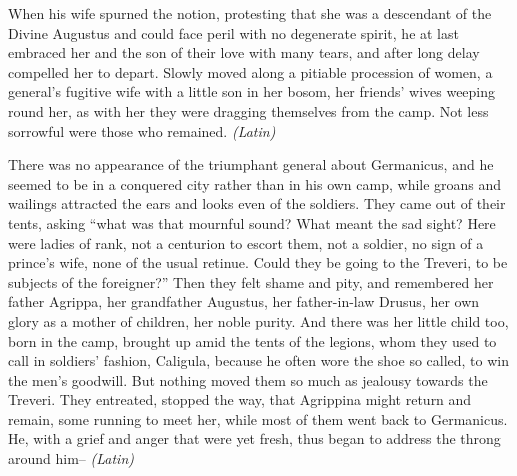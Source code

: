 When his wife spurned the notion, protesting that she was a descendant of the Divine Augustus and could face peril with no degenerate spirit, he at last embraced her and the son of their love with many tears, and after long delay compelled her to depart. Slowly moved along a pitiable procession of women, a general's fugitive wife with a little son in her bosom, her friends' wives weeping round her, as with her they were dragging themselves from the camp. Not less sorrowful were those who remained. \emph{(Latin)}


There was no appearance of the triumphant general about Germanicus, and he seemed to be in a conquered city rather than in his own camp, while groans and wailings attracted the ears and looks even of the soldiers. They came out of their tents, asking ``what was that mournful sound? What meant the sad sight? Here were ladies of rank, not a centurion to escort them, not a soldier, no sign of a prince's wife, none of the usual retinue. Could they be going to the Treveri, to be subjects of the foreigner?'' Then they felt shame and pity, and remembered her father Agrippa, her grandfather Augustus, her father-in-law Drusus, her own glory as a mother of children, her noble purity. And there was her little child too, born in the camp, brought up amid the tents of the legions, whom they used to call in soldiers' fashion, Caligula, because he often wore the shoe so called, to win the men's goodwill. But nothing moved them so much as jealousy towards the Treveri. They entreated, stopped the way, that Agrippina might return and remain, some running to meet her, while most of them went back to Germanicus. He, with a grief and anger that were yet fresh, thus began to address the throng around him-- \emph{(Latin)}


